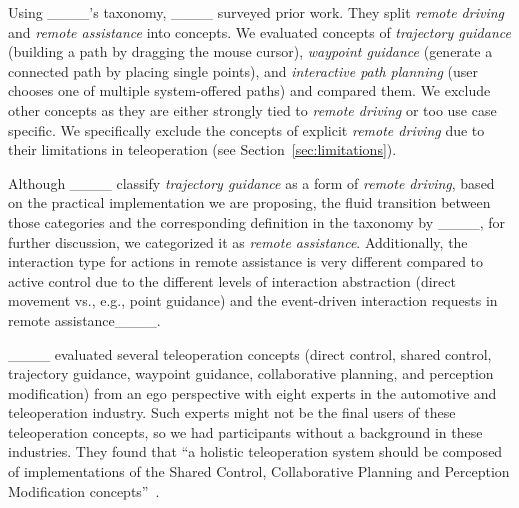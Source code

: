 Using ____'s taxonomy, ____ surveyed prior work. They split \textit{remote driving} and \textit{remote assistance} into concepts. We evaluated concepts of \textit{trajectory guidance} (building a path by dragging the mouse cursor), \textit{waypoint guidance} (generate a connected path by placing single points), and \textit{interactive path planning} (user chooses one of multiple system-offered paths) and compared them. We exclude other concepts as they are either strongly tied to \textit{remote driving} or too use case specific. We specifically exclude the concepts of explicit \textit{remote driving} due to their limitations in teleoperation (see Section~\ref{sec:limitations}). %

Although ____ classify \textit{trajectory guidance} as a form of \textit{remote driving}, based on the practical implementation we are proposing, the fluid transition between those categories and the corresponding definition in the taxonomy by ____, for further discussion, we categorized it as \textit{remote assistance}.
Additionally, the interaction type for actions in remote assistance is very different compared to active control due to the different levels of interaction abstraction (direct movement vs., e.g., point guidance) and the event-driven interaction requests in remote assistance____. 

____ evaluated several teleoperation concepts (direct control, shared control, trajectory guidance, waypoint guidance, collaborative planning, and perception modification) from an ego perspective with eight experts in the automotive and teleoperation industry. Such experts might not be the final users of these teleoperation concepts, so we had participants without a background in these industries. They found that ``a holistic teleoperation system should be composed of implementations of the Shared Control, Collaborative Planning and Perception Modification concepts''~\cite[p. 639]{brecht2024evaluation}.



